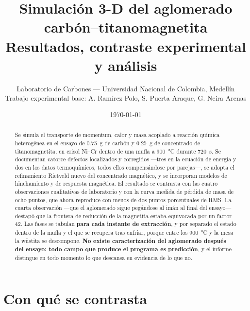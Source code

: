 \documentclass[11pt,a4paper]{article}
\title{\vspace{-1.5cm}Simulación 3-D del aglomerado carbón--titanomagnetita\\
\large Resultados, contraste experimental y análisis}
\author{Laboratorio de Carbones --- Universidad Nacional de Colombia, Medellín\\
\small Trabajo experimental base: A. Ramírez Polo, S. Puerta Araque, G. Neira Arenas}
\date{\today}
\newcommand{\ojo}[1]{\textcolor{aviso}{\textbf{#1}}}
\begin{document}
\maketitle

\begin{abstract}
\noindent
Se simula el transporte de momentum, calor y masa acoplado a reacción química
heterogénea en el ensayo de \SI{0.75}{\gram} de carbón y \SI{0.25}{\gram} de
concentrado de titanomagnetita, en crisol Ni--Cr dentro de una mufla a
\SI{900}{\celsius} durante \SI{720}{\second}. Se documentan catorce defectos
localizados y corregidos ---tres en la ecuación de energía y dos en los datos
termoquímicos, todos ellos compensándose por parejas---, se adopta el
refinamiento Rietveld nuevo del concentrado magnético, y se incorporan modelos
de hinchamiento y de respuesta magnética. El resultado se contrasta con las
cuatro observaciones cualitativas de laboratorio y con la curva medida de
pérdida de masa de ocho puntos, que ahora reproduce con menos de dos puntos
porcentuales de RMS. La cuarta observación ---que el aglomerado sigue pegándose al imán al final
del ensayo--- destapó que la frontera de reducción de la magnetita estaba
equivocada por un factor 42. Las fases se tabulan \textbf{para cada instante de
extracción}, y por separado el estado dentro de la mufla y el que se recupera
tras enfriar, porque entre los \SI{900}{\celsius} y la mesa la wüstita se
descompone. \ojo{No existe caracterización del aglomerado después del
ensayo: todo campo que produce el programa es predicción}, y el informe distingue
en todo momento lo que descansa en evidencia de lo que no.
\end{abstract}

\tableofcontents

\section{Con qué se contrasta}
\end{document}
